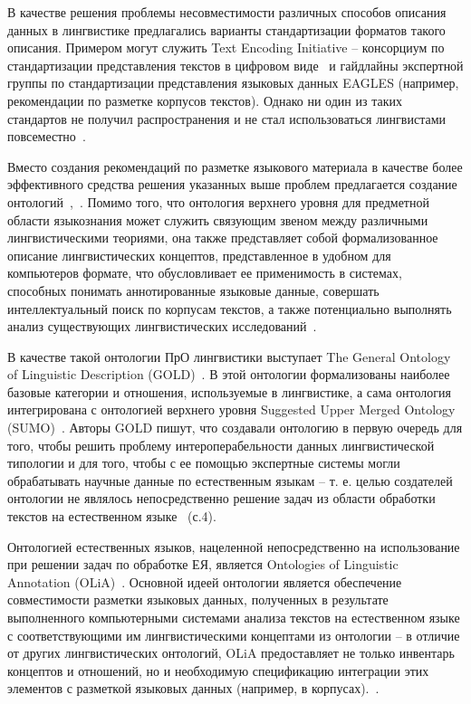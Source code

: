 В качестве решения проблемы несовместимости различных способов описания данных в лингвистике предлагались варианты стандартизации форматов такого описания.
Примером могут служить Text Encoding Initiative -- консорциум по стандартизации представления текстов в цифровом виде~\cite{Text_Encoding_Initiative} и гайдлайны экспертной группы по стандартизации представления языковых данных EAGLES (например, рекомендации по разметке корпусов текстов\cite{EAGLES_Recommendations}).
Однако ни один из таких стандартов не получил распространения и не стал использоваться лингвистами повсеместно~\cite[p.~4]{Ide2010WhatDI}.

Вместо создания рекомендаций по разметке языкового материала в качестве более эффективного средства решения указанных выше проблем предлагается создание онтологий~\cite{schalley_2019},~\cite{mccrae_2015}.
Помимо того, что онтология верхнего уровня для предметной области языкознания может служить связующим звеном между различными лингвистическими теориями, она также представляет собой формализованное описание лингвистических концептов, представленное в удобном для компьютеров формате, что обусловливает ее применимость в системах, способных понимать аннотированные языковые данные, совершать интеллектуальный поиск по корпусам текстов, а также потенциально выполнять анализ существующих лингвистических исследований~\cite{Farrar2002ACO}.

В качестве такой онтологии ПрО лингвистики выступает The General Ontology of Linguistic Description (GOLD)~\cite{gold}.
В этой онтологии формализованы наиболее базовые категории и отношения, используемые в лингвистике, а сама онтология интегрирована с онтологией верхнего уровня Suggested Upper Merged Ontology (SUMO)~\cite{pease_2002_sumo}.
Авторы GOLD пишут, что создавали онтологию в первую очередь для того, чтобы решить проблему интероперабельности данных лингвистической типологии и для того, чтобы с ее помощью экспертные системы могли обрабатывать научные данные по естественным языкам -- т. е. целью создателей онтологии не являлось непосредственно решение задач из области обработки текстов на естественном языке~\cite{farrar_2003} (с.4).

Онтологией естественных языков, нацеленной непосредственно на использование при решении задач по обработке ЕЯ, является Ontologies of Linguistic Annotation (OLiA)~\cite{chiarcos-2012-ontologies}.
Основной идеей онтологии является обеспечение совместимости разметки языковых данных, полученных в результате выполненного компьютерными системами анализа текстов на естественном языке с соответствующими им лингвистическими концептами из онтологии -- в отличие от других лингвистических онтологий, OLiA предоставляет не только инвентарь концептов и отношений, но и необходимую спецификацию интеграции этих элементов с разметкой языковых данных (например, в корпусах).~\cite[p.~4]{chiarcos-2012-ontologies}.

